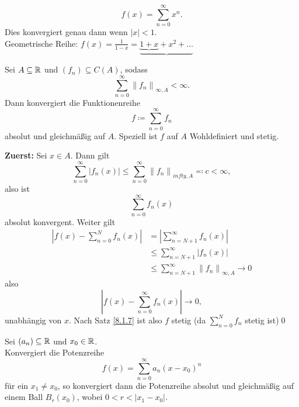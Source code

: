 \begin{subexample}
	\[
		f(x) = \sum_{n=0}^{\infty} x^n.
	\]
	Dies konvergiert genau dann wenn $ |x| < 1 $.\\
	Geometrische Reihe: $ f(x) = \frac{ 1 }{ 1 - x } = \underbrace{\underbrace{1 + x} + x^2 + \dotsc} $
\end{subexample}

\begin{subtheorem}
	Sei $ A \subseteq \mathbb{R}  $ und $ (f_n) \subseteq C(A) $, sodass
	\[
		\sum_{n=0}^{\infty} \left\| f_n \right\|_{\infty, A} < \infty.
	\]
	Dann konvergiert die Funktionenreihe
	\[
		f \coloneqq \sum_{n=0}^{\infty} f_n
	\]
	absolut und gleichmäßig auf $ A $. Speziell ist $ f $ auf $ A $ Wohldefiniert und stetig.
\end{subtheorem}

\begin{subproof*}
	\textbf{Zuerst:} Sei $ x \in A $. Dann gilt
	\[
		\sum_{n=0}^{\infty} \left| f_n(x) \right| \leq \sum_{n=0}^{\infty} \left\| f_n \right\|_{infty, A} \eqcolon c < \infty,
	\]
	also ist
	\[
		\sum_{n=0}^{\infty} f_n(x)
	\]
	absolut konvergent. Weiter gilt
	\begin{align*}
		\left| f(x) - \sum_{n=0}^{N} f_n(x) \right| &= \left| \sum_{n=N+1}^{\infty} f_n(x) \right| \\
		~&\leq \sum_{n=N+1}^{\infty} \left| f_n(x) \right| \\
		~& \leq \sum_{n=N+1}^{\infty} \left\| f_n \right\|_{\infty, A} \to 0
	\end{align*}
	also
	\[
		\left| f(x) - \sum_{n=0}^{\infty} f_n(x) \right| \to 0,
	\]
	unabhängig von $ x $.
	Nach Satz \ref{8.1.7} ist also $ f $ stetig (da $ \sum_{n=0}^{N} f_n $ stetig ist)\qed
\end{subproof*}

\begin{subtheorem}
	Sei $ (a_n) \subseteq \mathbb{R}  $ und $ x_0 \in \mathbb{R}  $.\\
	Konvergiert die Potenzreihe
	\[
		f(x) = \sum_{n=0}^{\infty} a_n(x-x_0)^n
	\]
	für ein $ x_1 \neq x_0 $, so konvergiert dann die Potenzreihe absolut  und gleichmäßig auf einem Ball $ B_{r}(x_0)  $, wobei $ 0 < r < \left| x_1 - x_0 \right|  $.
\end{subtheorem}


